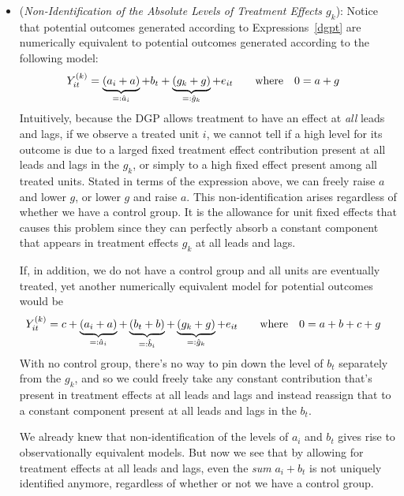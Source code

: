 \documentclass[12pt]{article}
\theoremstyle{plain}
\theoremstyle{definition}
\theoremstyle{remark}
\begin{document}
\begin{itemize}
  \item
    (\emph{Non-Identification of the Absolute Levels of Treatment
    Effects $g_k$}):
    Notice that potential outcomes generated according to
    Expressions~\ref{dgpt} are numerically equivalent to potential
    outcomes generated according to the following model:
    \begin{align*}
      Y_{it}^{(k)}
      &=
      \underbrace{%
      ({a}_i+a)
      }_{%
        =:\hat{a}_i
      }
      +
      {b}_t
      +
      \underbrace{%
      (g_k+g)
      }_{%
        =:\hat{g}_k
      }
      +
      e_{it}
      \qquad\text{where}\quad
      0 = a+g
    \end{align*}
    Intuitively, because the DGP allows treatment to have an effect at
    \emph{all} leads and lags, if we observe a treated unit $i$, we
    cannot tell if a high level for its outcome is due to a larged fixed
    treatment effect contribution present at all leads and lags in the
    $g_k$, or simply to a high fixed effect present among all treated
    units.
    Stated in terms of the expression above, we can freely raise $a$ and
    lower $g$, or lower $g$ and raise $a$.
    This non-identification arises regardless of whether we have a
    control group.
    It is the allowance for unit fixed effects that causes this problem
    since they can perfectly absorb a constant component that appears in
    treatment effects $g_k$ at all leads and lags.

    If, in addition, we do not have a control group and all units are
    eventually treated, yet another numerically equivalent model for
    potential outcomes would be
    \begin{align*}
      Y_{it}^{(k)}
      &=
      c+
      \underbrace{%
      ({a}_i+a)
      }_{%
        =:\hat{a}_i
      }
      +
      \underbrace{%
      ({b}_t+b)
      }_{%
        =:\hat{b}_i
      }
      +
      \underbrace{%
      (g_k+g)
      }_{%
        =:\hat{g}_k
      }
      +
      e_{it}
      \qquad\text{where}\quad
      0 = a+b+c+g
    \end{align*}
    With no control group, there's no way to pin down the level of $b_t$
    separately from the $g_k$, and so we could freely take any
    constant contribution that's present in treatment effects at all
    leads and lags and instead reassign that to a constant component
    present at all leads and lags in the $b_t$.

    We already knew that non-identification of the levels of $a_i$ and
    $b_t$ gives rise to observationally equivalent models.
    But now we see that by allowing for treatment effects at all leads
    and lags, even the \emph{sum} $a_i+b_t$ is not uniquely identified
    anymore, regardless of whether or not we have a control group.


\end{itemize}
\end{document}
